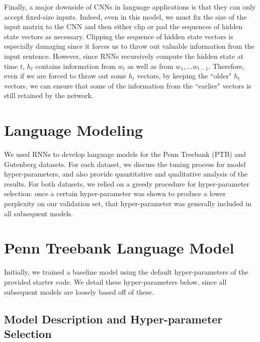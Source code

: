 \documentclass[a4paper]{article}
\begin{document}
\newline
\newline
Finally, a major downside of CNNs in language applications is that they can only accept fixed-size inputs. Indeed, even in this model, we must fix the size of the input matrix to the CNN and then either clip or pad the sequences of hidden state vectors as necessary. Clipping the sequence of hidden state vectors is especially damaging since it forces us to throw out valuable information from the input sentence. However, since RNNs recursively compute the hidden state at time $t$, $h_t$ contains information from $w_t$ as well as from $w_1, ... w_{t-1}$. Therefore, even if we are forced to throw out some $h_t$ vectors, by keeping the ``older" $h_t$ vectors, we can ensure that some of the information from the ``earlier" vectors is still retained by the network. 
\newline
\newline

\section{Language Modeling}

We used RNNs to develop language models for the Penn Treebank (PTB) and Gutenberg datasets. For each dataset, we discuss the tuning process for model hyper-parameters, and also provide quantitative and qualitative analysis of the results. For both datasets, we relied on a greedy procedure for hyper-parameter selection: once a certain hyper-parameter was shown to produce a lower perplexity on our validation set, that hyper-parameter was generally included in all subsequent models. 

\section*{Penn Treebank Language Model}
Initially, we trained a baseline model using the default hyper-parameters of the provided starter code. We detail these hyper-parameters below, since all subsequent models are loosely based off of these. 

\subsection*{Model Description and Hyper-parameter Selection}
\end{document}

